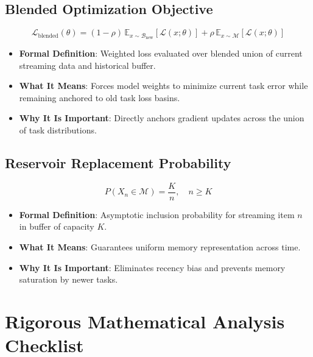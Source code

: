 \documentclass[11pt,a4paper]{article}
\theoremstyle{definition}
\begin{document}
\subsection{Blended Optimization Objective}
{\boldmath
\begin{equation}
\mathcal{L}_{\text{blended}}(\theta) = (1 - \rho) \, \mathbb{E}_{x \sim \mathcal{B}_{\text{new}}} [\mathcal{L}(x; \theta)] + \rho \, \mathbb{E}_{x \sim \mathcal{M}} [\mathcal{L}(x; \theta)]
\end{equation}
}
\begin{itemize}
    \item \textbf{Formal Definition}: Weighted loss evaluated over blended union of current streaming data and historical buffer.
    \item \textbf{What It Means}: Forces model weights to minimize current task error while remaining anchored to old task loss basins.
    \item \textbf{Why It Is Important}: Directly anchors gradient updates across the union of task distributions.
\end{itemize}

\subsection{Reservoir Replacement Probability}
{\boldmath
\begin{equation}
P(X_n \in \mathcal{M}) = \frac{K}{n}, \quad n \ge K
\end{equation}
}
\begin{itemize}
    \item \textbf{Formal Definition}: Asymptotic inclusion probability for streaming item $n$ in buffer of capacity $K$.
    \item \textbf{What It Means}: Guarantees uniform memory representation across time.
    \item \textbf{Why It Is Important}: Eliminates recency bias and prevents memory saturation by newer tasks.
\end{itemize}

\section{Rigorous Mathematical Analysis Checklist}
\end{document}
